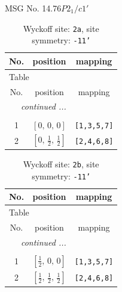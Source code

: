 \documentclass[fleqn,8pt]{jsarticle}
\begin{document}
\setcounter{MaxMatrixCols}{32}

\renewcommand{\tablename}{Table~}
\renewcommand{\figurename}{Figure~}
\begin{center}
\LARGE
MSG No. 14.76\quad$P2_{1}/c1'$
\end{center}
\renewcommand{\arraystretch}{1.2}
\begin{longtable}{ccc}
\caption{Wyckoff site: {\tt 2a}, site symmetry: {\tt -11'}}
 \\
 \hline \hline
No. & position & mapping \\ \hline \endfirsthead

\multicolumn{2}{l}{\tablename\ \thetable{}} \\
 \hline \hline
No. & position & mapping \\ \hline \endhead

 \hline \hline
\multicolumn{2}{r}{\footnotesize\it continued ...} \\ \endfoot

 \hline \hline
\multicolumn{2}{r}{} \\ \endlastfoot

1 & $\left[ 0,\, 0,\, 0 \right]$ & {\tt [1,3,5,7]} \\ \hline
2 & $\left[ 0,\, \frac{1}{2},\, \frac{1}{2} \right]$ & {\tt [2,4,6,8]} \\
\end{longtable}
\renewcommand{\arraystretch}{1.2}
\begin{longtable}{ccc}
\caption{Wyckoff site: {\tt 2b}, site symmetry: {\tt -11'}}
 \\
 \hline \hline
No. & position & mapping \\ \hline \endfirsthead

\multicolumn{2}{l}{\tablename\ \thetable{}} \\
 \hline \hline
No. & position & mapping \\ \hline \endhead

 \hline \hline
\multicolumn{2}{r}{\footnotesize\it continued ...} \\ \endfoot

 \hline \hline
\multicolumn{2}{r}{} \\ \endlastfoot

1 & $\left[ \frac{1}{2},\, 0,\, 0 \right]$ & {\tt [1,3,5,7]} \\ \hline
2 & $\left[ \frac{1}{2},\, \frac{1}{2},\, \frac{1}{2} \right]$ & {\tt [2,4,6,8]} \\
\end{longtable}
\end{document}
